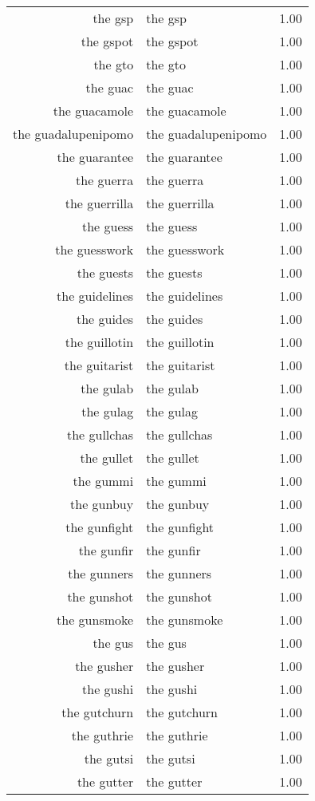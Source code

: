\begin{table}[ht]
\begin{tabular}{rlr}
  the gsp & the gsp & 1.00 \\ 
  the gspot & the gspot & 1.00 \\ 
  the gto & the gto & 1.00 \\ 
  the guac & the guac & 1.00 \\ 
  the guacamole & the guacamole & 1.00 \\ 
  the guadalupenipomo & the guadalupenipomo & 1.00 \\ 
  the guarantee & the guarantee & 1.00 \\ 
  the guerra & the guerra & 1.00 \\ 
  the guerrilla & the guerrilla & 1.00 \\ 
  the guess & the guess & 1.00 \\ 
  the guesswork & the guesswork & 1.00 \\ 
  the guests & the guests & 1.00 \\ 
  the guidelines & the guidelines & 1.00 \\ 
  the guides & the guides & 1.00 \\ 
  the guillotin & the guillotin & 1.00 \\ 
  the guitarist & the guitarist & 1.00 \\ 
  the gulab & the gulab & 1.00 \\ 
  the gulag & the gulag & 1.00 \\ 
  the gullchas & the gullchas & 1.00 \\ 
  the gullet & the gullet & 1.00 \\ 
  the gummi & the gummi & 1.00 \\ 
  the gunbuy & the gunbuy & 1.00 \\ 
  the gunfight & the gunfight & 1.00 \\ 
  the gunfir & the gunfir & 1.00 \\ 
  the gunners & the gunners & 1.00 \\ 
  the gunshot & the gunshot & 1.00 \\ 
  the gunsmoke & the gunsmoke & 1.00 \\ 
  the gus & the gus & 1.00 \\ 
  the gusher & the gusher & 1.00 \\ 
  the gushi & the gushi & 1.00 \\ 
  the gutchurn & the gutchurn & 1.00 \\ 
  the guthrie & the guthrie & 1.00 \\ 
  the gutsi & the gutsi & 1.00 \\ 
  the gutter & the gutter & 1.00 \\ 

\end{tabular}
\end{table}
